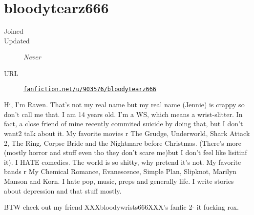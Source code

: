 \section{bloodytearz666}
\begin{description}
	\item[Joined] 
	\item[Updated] \textit{Never} %
	\item[URL] \href{https://www.fanfiction.net/u/903576/bloodytearz666}{\texttt{fanfiction.net/u/903576/bloodytearz666}}
\end{description}

Hi, I'm Raven. That's not my real name but my real name (Jennie) is crappy
so don't call me that. I am 14 years old. I'm a WS, which means a wrist-slitter.
In fact, a close friend of mine recently commited suicide by doing that,
but I don't want2 talk about it. My favorite movies r The Grudge, Underworld,
Shark Attack 2, The Ring, Corpse Bride and the Nightmare before Christmas.
(There's more (mostly horror and stuff even tho they don't scare me)but I don't
feel like lisitinf it). I HATE comedies. The world is so shitty, why pretend it's not.
My favorite bands r My Chemical Romance, Evanescence, Simple Plan, Slipknot,
Marilyn Manson and Korn. I hate pop, music, preps and generally life.
I write stories about depression and that stuff mostly.

BTW check out my friend XXXbloodywrists666XXX's fanfic 2- it fucking rox.
